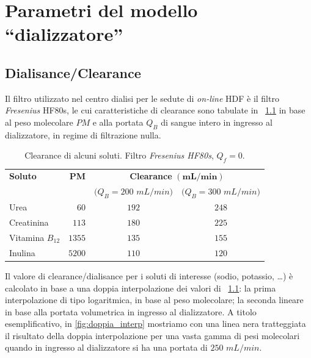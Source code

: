 \chapter{Parametri del modello ``dializzatore''}\label{app:B}



\section{Dialisance/Clearance}
Il filtro utilizzato nel centro dialisi per le sedute di \textit{on-line} HDF è il filtro \textit{Fresenius} HF80s, le cui caratteristiche di clearance sono tabulate in \tablename~\ref{tab:CL} in base al peso molecolare $PM$ e alla portata $Q_B$ di sangue intero in ingresso al dializzatore, in regime di filtrazione nulla.
\begin{table}[htb]
	\centering
	\caption{Clearance di alcuni soluti. Filtro \textit{Fresenius HF80s}, $Q_f=0.$}\label{tab:CL}
	\begin{tabular}{lrcc}
	\toprule 
		\textbf{Soluto}   & \textbf{PM} & \multicolumn{2}{c}{\textbf{Clearance} $\mathbf{(mL/min)}$}  \\
		\cmidrule(lr){3-4}
		                  &             & $(Q_B=200$ $mL/min)$ & $(Q_B=300$ $mL/min)$ \\
  \midrule
  	Urea              & $60$        & $192$               & $248$               \\
  	Creatinina        & $113$       & $180$               & $225$               \\
  	Vitamina $B_{12}$ & $1355$      & $135$               & $155$               \\
  	Inulina           & $5200$      & $110$               & $120$               \\
  \bottomrule
\end{tabular}
\end{table}
Il valore di clearance/dialisance per i soluti di interesse (sodio, potassio, \ldots) è calcolato in base a una doppia interpolazione dei valori di \tablename~\ref{tab:CL}: la prima interpolazione di tipo logaritmica, in base al peso molecolare; la seconda lineare in base alla portata volumetrica in ingresso al dializzatore. A titolo esemplificativo, in \figurename\ref{fig:doppia_interp} mostriamo con una linea nera tratteggiata il risultato della doppia interpolazione per una vasta gamma di pesi molecolari quando in ingresso al dializzatore si ha una portata di $250$ $mL/min$.
